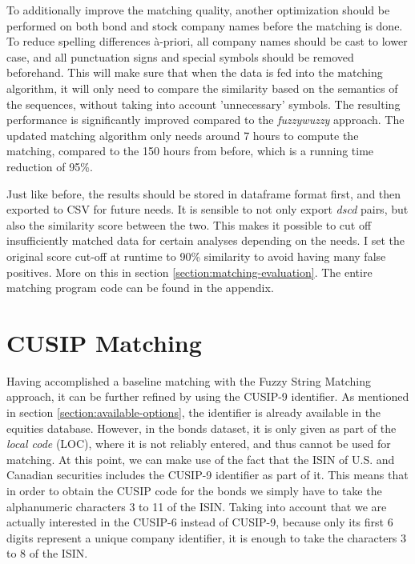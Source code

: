 To additionally improve the matching quality, another optimization should be performed on both bond and stock company names before the matching is done. To reduce spelling differences \`{a}-priori, all company names should be cast to lower case, and all punctuation signs and special symbols should be removed beforehand. This will make sure that when the data is fed into the matching algorithm, it will only need to compare the similarity based on the semantics of the sequences, without taking into account 'unnecessary' symbols. The resulting performance is significantly improved compared to the \textit{fuzzywuzzy} approach. The updated matching algorithm only needs around 7 hours to compute the matching, compared to the 150 hours from before, which is a running time reduction of 95\%. 

Just like before, the results should be stored in dataframe format first, and then exported to CSV for future needs. It is sensible to not only export \textit{dscd} pairs, but also the similarity score between the two. This makes it possible to cut off insufficiently matched data for certain analyses depending on the needs. I set the original score cut-off at runtime to 90\% similarity to avoid having many false positives. More on this in section \ref{section:matching-evaluation}. The entire matching program code can be found in the appendix. %

\section{CUSIP Matching} \label{section:cusip-matching}
Having accomplished a baseline matching with the Fuzzy String Matching approach, it can be further refined by using the CUSIP-9 identifier. As mentioned in section \ref{section:available-options}, the identifier is already available in the equities database. However, in the bonds dataset, it is only given as part of the \textit{local code} (LOC), where it is not reliably entered, and thus cannot be used for matching. At this point, we can make use of the fact that the ISIN of U.S. and Canadian securities includes the CUSIP-9 identifier as part of it. This means that in order to obtain the CUSIP code for the bonds we simply have to take the alphanumeric characters 3 to 11 of the ISIN. Taking into account that we are actually interested in the CUSIP-6 instead of CUSIP-9, because only its first 6 digits represent a unique company identifier, it is enough to take the characters 3 to 8 of the ISIN. 

